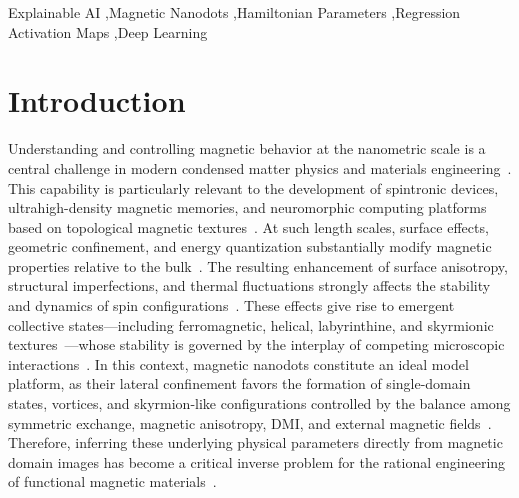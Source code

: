 \documentclass[final,5p,times,twocolumn]{elsarticle}
\begin{document}
\begin{frontmatter}
\begin{keyword}
Explainable AI \sep Magnetic Nanodots \sep Hamiltonian Parameters \sep Regression Activation Maps \sep Deep Learning
\end{keyword}

\end{frontmatter}

\linenumbers


\section{Introduction}\label{sec:intro}

Understanding and controlling magnetic behavior at the nanometric scale is a central challenge in modern condensed matter physics and materials engineering~\cite{heinrich2021quantum}. This capability is particularly relevant to the development of spintronic devices, ultrahigh-density magnetic memories, and neuromorphic computing platforms based on topological magnetic textures~\cite{wang2022fundamental, fert2024electrical}. At such length scales, surface effects, geometric confinement, and energy quantization substantially modify magnetic properties relative to the bulk~\cite{issa2013magnetic}. The resulting enhancement of surface anisotropy, structural imperfections, and thermal fluctuations strongly affects the stability and dynamics of spin configurations~\cite{charalampidis2023metadynamics}. These effects give rise to emergent collective states—including ferromagnetic, helical, labyrinthine, and skyrmionic textures~\cite{yua2017magnetic, birch2020real, yu2021magnetic, zhang2023magnetic}—whose stability is governed by the interplay of competing microscopic interactions~\cite{tokura2020magnetic}. In this context, magnetic nanodots constitute an ideal model platform, as their lateral confinement favors the formation of single-domain states, vortices, and skyrmion-like configurations controlled by the balance among symmetric exchange, magnetic anisotropy, DMI, and external magnetic fields~\cite{zelent2023stabilization, rohart2013skyrmion}. Therefore, inferring these underlying physical parameters directly from magnetic domain images has become a critical inverse problem for the rational engineering of functional magnetic materials~\cite{kong2023quantifying}.
\end{document}
